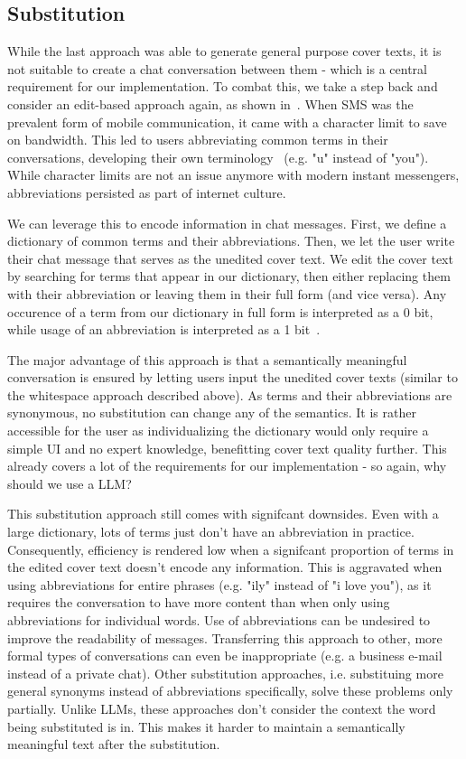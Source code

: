 \subsection{Substitution}
\label{sec:substitution}
While the last approach was able to generate general purpose cover texts, it is not suitable to create a chat conversation between them - which is a central requirement for our implementation. To combat this, we take a step back and consider an edit-based approach again, as shown in~\cite{shirali-shahrezaTextSteganographySMS2007}. When \gls{SMS} was the prevalent form of mobile communication, it came with a character limit to save on bandwidth. This led to users abbreviating common terms in their conversations, developing their own terminology~\cite{shirali-shahrezaTextSteganographySMS2007} (e.g. "u" instead of "you"). While character limits are not an issue anymore with modern instant messengers, abbreviations persisted as part of internet culture.

We can leverage this to encode information in chat messages. First, we define a dictionary of common terms and their abbreviations. Then, we let the user write their chat message that serves as the unedited cover text. We edit the cover text by searching for terms that appear in our dictionary, then either replacing them with their abbreviation or leaving them in their full form (and vice versa). Any occurence of a term from our dictionary in full form is interpreted as a 0 bit, while usage of an abbreviation is interpreted as a 1 bit~\cite{shirali-shahrezaTextSteganographySMS2007}.

The major advantage of this approach is that a semantically meaningful conversation is ensured by letting users input the unedited cover texts (similar to the whitespace approach described above). As terms and their abbreviations are synonymous, no substitution can change any of the semantics. It is rather accessible for the user as individualizing the dictionary would only require a simple \gls{UI} and no expert knowledge, benefitting cover text quality further. This already covers a lot of the requirements for our implementation - so again, why should we use a \gls{LLM}?

This substitution approach still comes with signifcant downsides. Even with a large dictionary, lots of terms just don't have an abbreviation in practice. Consequently, efficiency is rendered low when a signifcant proportion of terms in the edited cover text doesn't encode any information. This is aggravated when using abbreviations for entire phrases (e.g. "ily" instead of "i love you"), as it requires the conversation to have more content than when only using abbreviations for individual words. Use of abbreviations can be undesired to improve the readability of messages. Transferring this approach to other, more formal types of conversations can even be inappropriate (e.g. a business e-mail instead of a private chat). Other substitution approaches, i.e. substituing more general synonyms instead of abbreviations specifically, solve these problems only partially. Unlike \glspl{LLM}, these approaches don't consider the context the word being substituted is in. This makes it harder to maintain a semantically meaningful text after the substitution.

